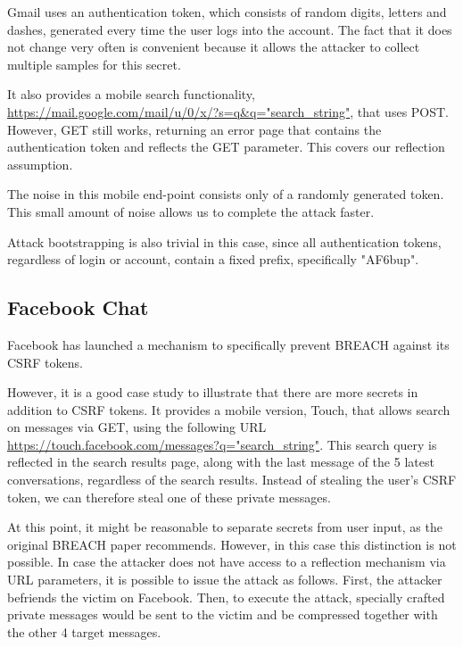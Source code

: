 \documentclass[a4paper, 11 pt, conference]{article}  %
\begin{document}
Gmail uses an authentication token, which consists of random digits, letters
and dashes, generated every time the user logs into the account. The fact that
it does not change very often is
convenient because it allows the attacker to collect multiple samples for this
secret.

It also provides a mobile search functionality,
\url{https://mail.google.com/mail/u/0/x/?s=q\&q="search_string"},
that uses POST. However, GET still works, returning an error page that contains the authentication
token and reflects the GET parameter. This covers our reflection assumption.

The noise in this mobile end-point consists only of a randomly generated token.
This small amount of noise allows us to complete  the attack faster.

Attack bootstrapping is also trivial in this case, since all authentication tokens, regardless of login or
account, contain a fixed prefix, specifically "AF6bup".

\subsection{Facebook Chat}

Facebook has launched a mechanism to specifically prevent BREACH against its CSRF tokens.

However, it is a good case study to illustrate that there are more secrets in
addition to CSRF tokens. It provides a mobile version, Touch, that allows search on messages via GET, using
the following URL \url{https://touch.facebook.com/messages?q="search_string"}. This search query is reflected
in the search results page, along with the last message of the 5 latest conversations, regardless
of the search results. Instead of stealing the user's CSRF token, we can
therefore steal one of these private messages.

At this point, it might be reasonable to separate secrets from user input, as
the original BREACH paper recommends. However, in this case this distinction is
not possible. In case the attacker does not have access to a reflection
mechanism via URL parameters, it is possible to issue the attack as follows.
First, the attacker befriends the victim on Facebook. Then, to execute the
attack, specially crafted private messages would be sent to the victim and be
compressed together with the other 4 target messages.

\end{document}
